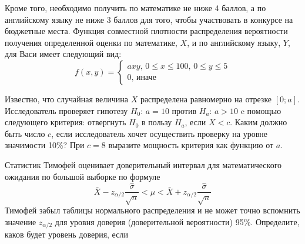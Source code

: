 \documentclass[addpoints, answers]{exam} %
\begin{document}
\begin{questions}
Кроме того, необходимо получить по математике не
ниже 4 баллов, а по английскому языку не ниже 3 баллов для того, чтобы участвовать в
конкурсе на бюджетные места. Функция совместной плотности распределения
вероятности получения определенной оценки по математике, $X$, и по английскому языку, $Y$, для Васи имеет следующий вид:
\[
f(x,y)=
\begin{cases}
axy, \, 0\leq x\leq 100,\, 0\leq y\leq 5 \\
0,\, \text{иначе}
\end{cases}
\]


\question Известно, что случайная величина $X$ распределена равномерно на отрезке $[0; a]$.
Исследователь проверяет гипотезу $H_0$: $a=10$ против $H_a$: $a>10$ c помощью
следующего критерия: отвергнуть $H_0$ в пользу $H_a$, если $X<c$. Каким должно быть
число $c$, если исследователь хочет осуществить проверку на уровне значимости 10\%? При
$c=8$ выразите мощность критерия как функцию от $a$.

\question Статистик Тимофей оценивает доверительный интервал для математического ожидания по большой выборке по формуле
\[
\bar{X}-z_{\alpha/2}\frac{\hat{\sigma}}{\sqrt{n}} < \mu < \bar{X}+z_{\alpha/2}\frac{\hat{\sigma}}{\sqrt{n}}
\]
Тимофей забыл таблицы нормального распределения и не может точно вспомнить значение $z_{\alpha/2}$ для уровня
доверия (доверительной вероятности) 95\%. Определите, каков будет уровень доверия, если
\end{questions}
\end{document}
